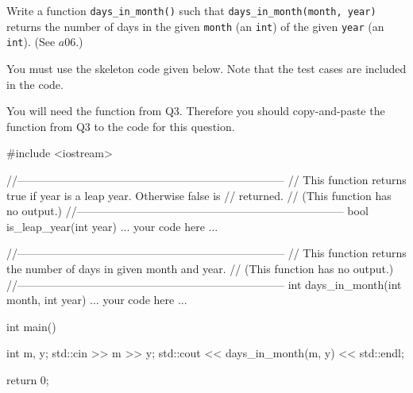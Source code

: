 Write a function \verb!days_in_month()! such that
\verb!days_in_month(month, year)! returns the number of days in the given
\verb!month! (an \verb!int!) of the given \verb!year! (an \verb!int!).
(See $a06$.)

You must use the skeleton code given below. Note that the test cases are
included in the code.

You will need the function from Q3. Therefore you should copy-and-paste the
function from Q3 to the code for this question.
\begin{console}
#include <iostream>


//------------------------------------------------------------------------
// This function returns true if year is a leap year. Otherwise false is
// returned.
// (This function has no output.)
//------------------------------------------------------------------------
bool is_leap_year(int year)
{
    ... your code here ...
}


//------------------------------------------------------------------------
// This function returns the number of days in given month and year.
// (This function has no output.)
//------------------------------------------------------------------------
int days_in_month(int month, int year)
{
    ... your code here ...
}


int main()
{
    int m, y;
    std::cin >> m >> y;
    std::cout << days_in_month(m, y) << std::endl;

    return 0;
}
\end{console}

